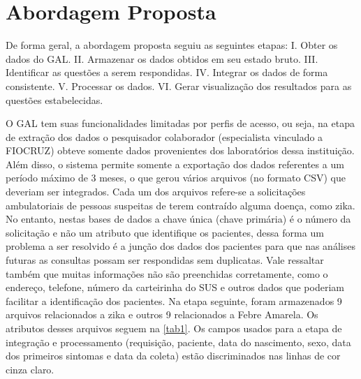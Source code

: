 \chapter{Abordagem Proposta}

De forma geral, a abordagem proposta seguiu as seguintes etapas:
I.	Obter os dados do GAL.
II.	Armazenar os dados obtidos em seu estado bruto.
III.	Identificar as questões a serem respondidas.
IV.	Integrar os dados de forma consistente.
V.	Processar os dados.
VI.	Gerar visualização dos resultados para as questões estabelecidas.

O GAL tem suas funcionalidades limitadas por perfis de acesso, ou seja, na etapa de extração dos dados o pesquisador colaborador (especialista vinculado a FIOCRUZ) obteve somente dados provenientes dos laboratórios dessa instituição. Além disso, o sistema permite somente a exportação dos dados referentes a um período máximo de 3 meses, o que gerou vários arquivos (no formato CSV) que deveriam ser integrados. Cada um dos arquivos refere-se a solicitações ambulatoriais de pessoas suspeitas de terem contraído alguma doença, como zika. No entanto, nestas bases de dados a chave única (chave primária) é o número da solicitação e não um atributo que identifique os pacientes, dessa forma um problema a ser resolvido é a junção dos dados dos pacientes para que nas análises futuras as consultas possam ser respondidas sem duplicatas. Vale ressaltar também que muitas informações não são preenchidas corretamente, como o endereço, telefone, número da carteirinha do SUS e outros dados que poderiam facilitar a identificação dos pacientes.
Na etapa seguinte, foram armazenados 9 arquivos relacionados a zika e outros 9 relacionados a Febre Amarela. Os atributos desses arquivos seguem na \ref{tab1}. Os campos usados para a etapa de integração e processamento (requisição, paciente, data do nascimento, sexo, data dos primeiros sintomas e data da coleta) estão discriminados nas linhas de cor cinza claro.

